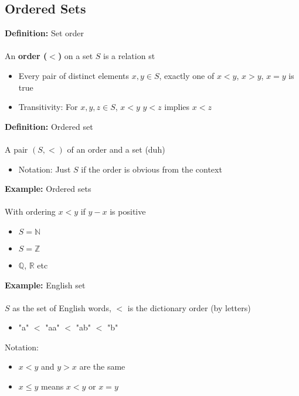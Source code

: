\documentclass{article}
\newcommand{\Z}{\mathbb{Z}}
\newcommand{\R}{\mathbb{R}}
\newcommand{\Q}{\mathbb{Q}}
\newcommand{\N}{\mathbb{N}}
\begin{document}
\subsection{Ordered Sets}
\begin{definition} 
\textbf{Definition:} Set order \\
~\\
An {\color{blue} \textbf{order ($<$)}} on a set $S$ is a relation st
\begin{itemize}
	\item Every pair of distinct elements $x,y\in S$, exactly one of $x<y$, $x>y$, $x=y$ is true
	\item Transitivity: For $x,y,z\in S$, $x<y$ $y<z$ implies $x<z$
\end{itemize}
\end{definition}
\begin{definition} 
\textbf{Definition:} Ordered set \\
~\\
A pair $(S,<)$ of an order and a set (duh)
\begin{itemize}
	\item Notation: Just $S$ if the order is obvious from the context
\end{itemize}
\end{definition}
\begin{example} 
\textbf{Example:} Ordered sets \\
~\\
With ordering $x<y$ if $y-x$ is positive
\begin{itemize}
	\item $S = \N$
	\item $S = \Z$
	\item $\Q$, $\R$ etc
\end{itemize}
\end{example}
\begin{example} 
\textbf{Example:} English set \\
~\\
$S$ as the set of English words, $<$ is the dictionary order (by letters)
\begin{itemize}
	\item "a" $<$ "aa" $<$ "ab" $<$ "b"
\end{itemize}
\end{example}
Notation:
\begin{itemize}
	\item $x<y$ and $y>x$ are the same
	\item $x\le y$ means $x<y$ or $x=y$
\end{itemize}
\end{document}
